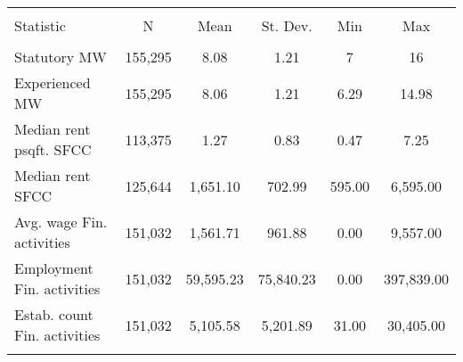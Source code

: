 
\begin{tabular}{@{\extracolsep{5pt}}lccccc} 
\\[-1.8ex]\hline 
\hline \\[-1.8ex] 
Statistic & \multicolumn{1}{c}{N} & \multicolumn{1}{c}{Mean} & \multicolumn{1}{c}{St. Dev.} & \multicolumn{1}{c}{Min} & \multicolumn{1}{c}{Max} \\ 
\hline \\[-1.8ex] 
Statutory MW & 155,295 & 8.08 & 1.21 & 7 & 16 \\ 
Experienced MW & 155,295 & 8.06 & 1.21 & 6.29 & 14.98 \\ 
Median rent psqft. SFCC & 113,375 & 1.27 & 0.83 & 0.47 & 7.25 \\ 
Median rent SFCC & 125,644 & 1,651.10 & 702.99 & 595.00 & 6,595.00 \\ 
Avg. wage Fin. activities & 151,032 & 1,561.71 & 961.88 & 0.00 & 9,557.00 \\ 
Employment Fin. activities & 151,032 & 59,595.23 & 75,840.23 & 0.00 & 397,839.00 \\ 
Estab. count Fin. activities & 151,032 & 5,105.58 & 5,201.89 & 31.00 & 30,405.00 \\ 
\hline \\[-1.8ex] 
\end{tabular} 
